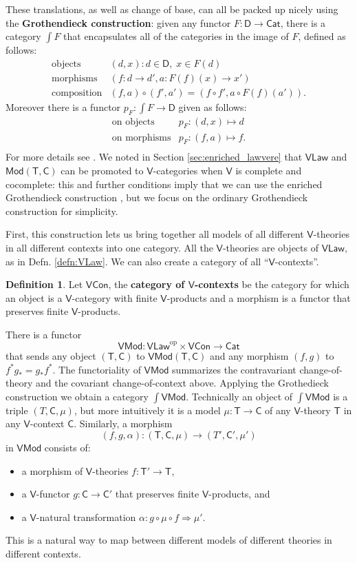\documentclass{amsart}
\theoremstyle{definition}
\newtheorem{definition}[theorem]{Definition}
\newcommand{\Cat}{\mathsf{Cat}}
\newcommand{\Law}{\mathsf{Law}}
\newcommand{\Mod}{\mathsf{Mod}}
\newcommand{\Con}{\mathsf{Con}}
\newcommand{\V}{\mathsf{V}}
\newcommand{\D}{\mathsf{D}}
\newcommand{\C}{\mathsf{C}}
\newcommand{\T}{\mathsf{T}}
\newcommand{\op}{\mathrm{op}}
\newcommand{\maps}{\colon}
\begin{document}
These translations, as well as change of base, can all be packed up nicely using the \textbf{Grothendieck construction}: given any functor $F\maps \D \to \Cat$, there is a category $\int F$ that encapsulates all of the categories in the image of $F$, defined
as follows:
\[\begin{array}{rl}
\text{objects} & (d,x) \colon d\in \D, \; x\in F(d)\\
\text{morphisms} & (f\maps d\to d',a\maps F(f)(x)\to x')\\
\text{composition} & (f,a) \circ (f',a') = (f \circ f', a \circ F(f)(a')).
\end{array}\]
Moreover there is a functor $p_F \maps \int F \to \D$ given as follows:
\[\begin{array}{rl}
\text{on objects} & p_F \maps (d,x) \mapsto d \\
\text{on morphisms} & p_F \maps (f,a) \mapsto f .\\
\end{array}\]
For more details see \cite{borceux,jacobs}. We noted in Section \ref{sec:enriched_lawvere} that $\V\Law$ and $\Mod(\T,\C)$ can be promoted to $\V$-categories when $\V$ is complete and cocomplete: this and further conditions imply that we can use the enriched Grothendieck construction \cite{beardsleywong}, but we focus on the ordinary Grothendieck
construction for simplicity.   

First, this construction lets us bring together all models of all different $\V$-theories in all different contexts into one category.   All the $\V$-theories
are objects of $\V\Law$, as in Defn. \ref{defn:VLaw}.   We can also create a category of all  ``$\V$-contexts''.

\begin{definition} 
\label{defn:VCon}
Let $\V\Con$, the \textbf{category of $\V$-contexts} be the category for which an
object is a $\V$-category with finite $\V$-products and  a morphism is a functor that
preserves finite $\V$-products.   
\end{definition}

There is a functor 
\[    \V\Mod\maps \V\Law^\op \times \V\Con \to \Cat \]
that sends any object $(\T,\C)$ to $\V\Mod(\T,\C)$ and any morphism $(f,g)$ to
$f^* g_* = g_* f^*$.   The functoriality of $\V\Mod$ summarizes the 
contravariant change-of-theory and the covariant change-of-context above.
Applying the Grothedieck construction we obtain a category $\int \V\Mod$. 
Technically an object of $\int \V\Mod$ is a triple $(T,\C,\mu)$, but more intuitively 
it is a model $\mu \maps \T \to \C$ of any $\V$-theory $\T$ in any $\V$-context $\C$.   Similarly, a morphism 
\[   (f,g,\alpha)\maps (\T,\C,\mu) \to (T',\C',\mu') \]
in $\V\Mod$ consists of:
\begin{itemize}
\item
a morphism of $\V$-theories $f \maps \T' \to \T$,
\item
a $\V$-functor $g \maps\C\to \C'$ that preserves finite $\V$-products, and
\item 
a $\V$-natural transformation $\alpha\maps g \circ \mu \circ f \Rightarrow \mu'$.
\end{itemize}
This is a natural way to map between different models of different theories in different contexts.
\end{document}

